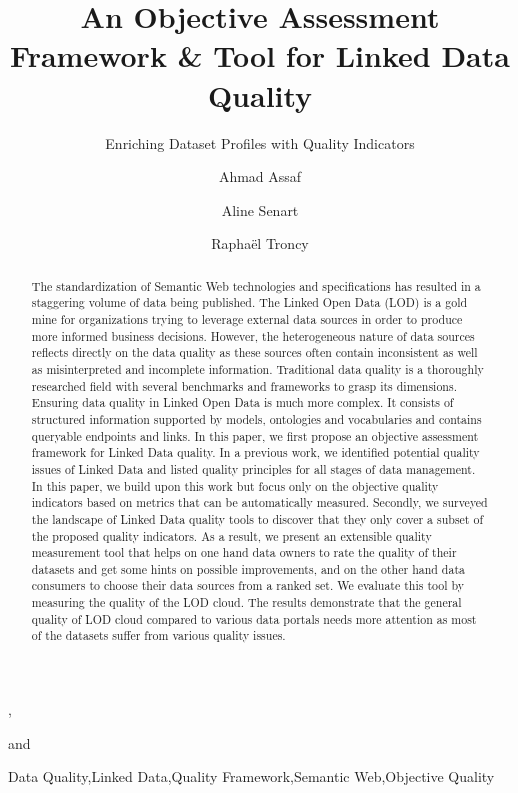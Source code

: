 \documentclass[onecolumn, crcready]{iosart2c}
\begin{document}
\begin{frontmatter}


\title{An Objective Assessment Framework \& Tool for Linked Data Quality}
\subtitle{Enriching Dataset Profiles with Quality Indicators}
\author[A,B]{Ahmad Assaf}, \author[A]{Aline Senart} and
\author[B]{Rapha\"{e}l Troncy}
\address[A]{SAP Research, SAP Labs France SAS,\\
805 avenue du Dr. Maurice Donat, BP 1216, 06254 Mougins Cedex, France\\
}
\address[B]{EURECOM,\\
2229 route des cretes, 06560 Sophia Antipolis, France\\
}


\begin{abstract}
The standardization of Semantic Web technologies and specifications has resulted in a staggering volume of data being published. The Linked Open Data (LOD) is a gold mine for organizations trying to leverage external data sources in order to produce more informed business decisions. However, the heterogeneous nature of data sources reflects directly on the data quality as these sources often contain inconsistent as well as misinterpreted and incomplete information. Traditional data quality is a thoroughly researched field with several benchmarks and frameworks to grasp its dimensions. Ensuring data quality in Linked Open Data is much more complex. It consists of structured information supported by models, ontologies and vocabularies and contains queryable endpoints and links. In this paper, we first propose an objective assessment framework for Linked Data quality. In a previous work, we identified potential quality issues of Linked Data and listed quality principles for all stages of data management. In this paper, we build upon this work but focus only on the objective quality indicators based on metrics that can be automatically measured. Secondly, we surveyed the landscape of Linked Data quality tools to discover that they only cover a subset of the proposed quality indicators. As a result, we present an extensible quality measurement tool that helps on one hand data owners to rate the quality of their datasets and get some hints on possible improvements, and on the other hand data consumers to choose their data sources from a ranked set. We evaluate this tool by measuring the quality of the LOD cloud. The results demonstrate that the general quality of LOD cloud compared to various data portals needs more attention as most of the datasets suffer from various quality issues.
\end{abstract}

\begin{keyword}
Data Quality\sep Linked Data\sep Quality Framework\sep Semantic Web\sep Objective Quality
\end{keyword}
\end{frontmatter}
\end{document}
